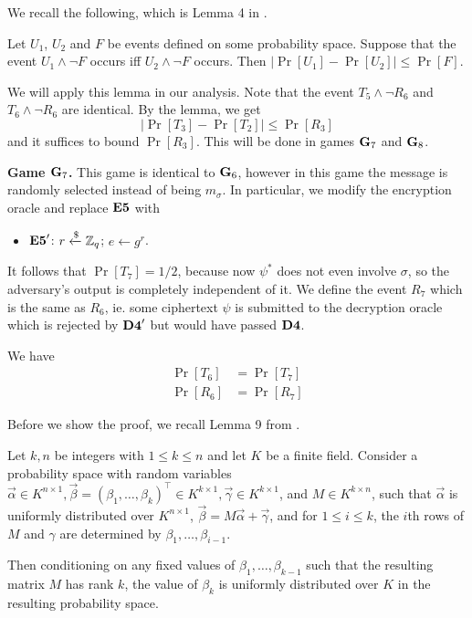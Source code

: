 We recall the following, which is Lemma 4 in \cite{cs01}.

\begin{lemma}
	\label{lem:neg-wedge}
	Let $U_1$, $U_2$ and $F$ be events defined on some probability space. Suppose that the event $U_1\wedge\neg F$ occurs iff $U_2\wedge\neg F$ occurs. Then $|\Pr[U_1]-\Pr[U_2]|\leq\Pr[F]$.
\end{lemma}

We will apply this lemma in our analysis. Note that the event $T_5\wedge\neg R_6$ and $T_6\wedge\neg R_6$ are identical. By the lemma, we get $$|\Pr[T_3]-\Pr[T_2]|\leq\Pr[R_3]$$ and it suffices to bound $\Pr[R_3]$. This will be done in games $\mathbf{G}_7$ and $\mathbf{G}_8$.

\textbf{Game $\mathbf{G}_7$.} This game is identical to $\mathbf{G}_6$, however in this game the message is randomly selected instead of being $m_\sigma$. In particular, we modify the encryption oracle and replace $\mathbf{E5}$ with
\begin{itemize}
	\item[]$\mathbf{E5}'$: $r\xleftarrow{\$}\mathbb{Z}_q$; $e\gets g^r$.
\end{itemize}
It follows that $\Pr[T_7] = 1/2$, because now $\psi^{*}$ does not even involve $\sigma$, so the adversary's output is completely independent of it. We define the event $R_7$ which is the same as $R_6$, ie. some ciphertext $\psi$ is submitted to the decryption oracle which is rejected by $\mathbf{D4}'$ but would have passed $\mathbf{D4}$.

\begin{lemma} We have
	\label{lem:t6t7}
	\begin{align*}
		\Pr[T_6] &= \Pr[T_7]\\
		\Pr[R_6] &= \Pr[R_7]
	\end{align*}
\end{lemma}

Before we show the proof, we recall Lemma 9 from \cite{cs01}.

\begin{lemma}
	\label{lem:independence}
	Let $k,n$ be integers with $1\leq k\leq n$ and let $K$ be a finite field. Consider a probability space with random variables $\vec{\alpha}\in K^{n\times 1}, \vec{\beta}=(\beta_1,\dots,\beta_k)^\top\in K^{k\times 1},\vec{\gamma}\in K^{k\times 1}$, and $M\in K^{k\times n}$, such that $\vec{\alpha}$ is uniformly distributed over $K^{n\times 1}$, $\vec{\beta}=M\vec{\alpha}+\vec{\gamma}$, and for $1\leq i\leq k$, the $i$th rows of $M$ and $\gamma$ are determined by $\beta_1,\dots,\beta_{i-1}$. 
	
	Then conditioning on any fixed values of $\beta_1,\dots,\beta_{k-1}$ such that the resulting matrix $M$ has rank $k$, the value of $\beta_k$ is uniformly distributed over $K$ in the resulting probability space.
\end{lemma}

